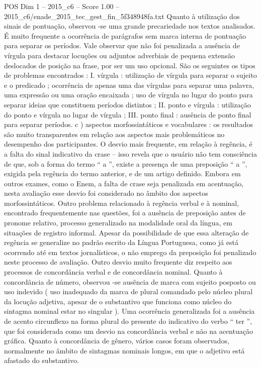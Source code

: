 \begin{textsample}{POS Dim 1 – 2015\_c6 – Score 1.00 – 2015\_c6/enade\_2015\_tec\_gest\_fin\_5f348948fa.txt}
Quanto à utilização dos sinais de pontuação, observou -se uma grande precariedade nos textos analisados.
É muito frequente a ocorrência de parágrafos sem marca interna de pontuação para separar os períodos.
Vale observar que não foi penalizada a ausência de vírgula para destacar locuções ou adjuntos adverbiais de pequena extensão deslocados de posição na frase, por ser um uso opcional.
São os seguintes os tipos de problemas encontrados : I. vírgula : utilização de vírgula para separar o sujeito e o predicado ; ocorrência de apenas uma das vírgulas para separar uma palavra, uma expressão ou uma oração encaixada ; uso de vírgula no lugar do ponto para separar ideias que constituem períodos distintos ; II. ponto e vírgula : utilização do ponto e vírgula no lugar de vírgula ; III. ponto final : ausência de ponto final para separar períodos. c ) aspectos morfossintáticos e vocabulares : os resultados são muito transparentes em relação aos aspectos mais problemáticos no desempenho dos participantes.
O desvio mais frequente, em relação à regência, é a falta do sinal indicativo da crase – isso revela que o usuário não tem consciência de que, sob a forma do termo “ a ”, existe a presença de uma preposição “ a ”, exigida pela regência do termo anterior, e de um artigo definido.
Embora em outros exames, como o Enem, a falta de crase seja penalizada em acentuação, nesta avaliação esse desvio foi considerado no âmbito dos aspectos morfossintáticos.
Outro problema relacionado à regência verbal e à nominal, encontrado frequentemente nas questões, foi a ausência de preposição antes de pronome relativo, processo generalizado na modalidade oral da língua, em situações de registro informal.
Apesar da possibilidade de que essa alteração de regência se generalize no padrão escrito da Língua Portuguesa, como já está ocorrendo até em textos jornalísticos, o não emprego da preposição foi penalizado neste processo de avaliação.
Outro desvio muito frequente diz respeito aos processos de concordância verbal e de concordância nominal.
Quanto à concordância de número, observou -se ausência de marca com sujeito posposto ou uso indevido ( uso inadequado da marca de plural comandado pelo núcleo plural da locução adjetiva, apesar de o substantivo que funciona como núcleo do sintagma nominal estar no singular ).
Uma ocorrência generalizada foi a ausência de acento circunflexo na forma plural do presente do indicativo do verbo “ ter ”, que foi considerada como um desvio na concordância verbal e não na acentuação gráfica.
Quanto à concordância de gênero, vários casos foram observados, normalmente no âmbito de sintagmas nominais longos, em que o adjetivo está afastado do substantivo.

\end{textsample}
